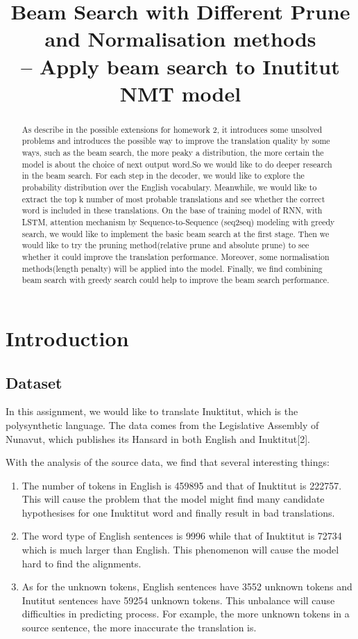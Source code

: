 \documentclass[a4paper]{article}
\title{Beam Search with Different Prune and Normalisation methods \\
-- Apply beam search to Inutitut NMT model}
\date{}
\begin{document}
\maketitle

\begin{abstract}

As describe in the possible extensions for homework 2, it introduces some unsolved problems and introduces the possible way to improve the translation quality by some ways, such as the beam search, the more peaky a distribution, the more certain the model is about the choice of next output word.So we would like to do deeper research in the beam search. For each step in the decoder, we would like to explore the probability distribution over the English vocabulary. Meanwhile, we would like to extract the top k number of most probable translations and see whether the correct word is included in these translations. On the base of training model of RNN, with LSTM, attention mechanism by Sequence-to-Sequence (seq2seq) modeling with greedy search, we would like to implement the basic beam search at the first stage. Then we would like to try the pruning method(relative prune and absolute prune) to see whether it could improve the translation performance. Moreover, some normalisation methods(length penalty) will be applied into the model. Finally, we find combining beam search with greedy search could help to improve the beam search performance.


\end{abstract}

\section{Introduction}
\subsection{Dataset}
In this assignment, we would like to translate Inuktitut, which is the polysynthetic language. The data comes from the Legislative Assembly of Nunavut, which publishes its Hansard in both English and Inuktitut[2].

With the analysis of the source data, we find that several interesting things:
\begin{enumerate}
\item The number of tokens in English is 459895 and that of Inuktitut is 222757. This will cause the problem that the model might find many candidate hypothesises for one Inuktitut word and finally result in bad translations.
\item The word type of English sentences is 9996 while that of Inuktitut is 72734 which is much larger than English. This phenomenon will cause the model hard to find the alignments.
\item As for the unknown tokens, English sentences have 3552 unknown tokens and Inutitut sentences have 59254 unknown tokens. This unbalance will cause difficulties in predicting process. For example, the more unknown tokens in a source sentence, the more inaccurate the translation is.
\end{enumerate}
\end{document}
